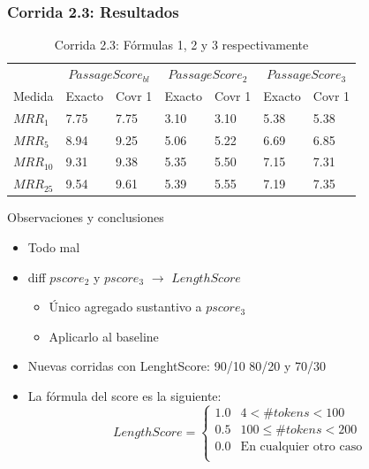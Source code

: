 \begin{frame}
\frametitle{Corrida 2.3: Resultados}
\begin{table}
\centering
\begin{center}

\begin{tabular}{|l | l | l | l | l | l | l |}

& \multicolumn{2}{|c|}{$PassageScore_{bl}$} & \multicolumn{2}{|c|}{$PassageScore_2$} & \multicolumn{2}{|c|}{$PassageScore_3$}\\ 
Medida & Exacto & Covr 1 & Exacto & Covr 1 & Exacto & Covr 1 \\ 
$MRR_{1}$ & 7.75 & 7.75 & 3.10 & 3.10 & 5.38 & 5.38  \\ 
$MRR_{5}$ & 8.94 & 9.25 & 5.06 & 5.22 &  6.69 & 6.85  \\ 
$MRR_{10}$ & 9.31 & 9.38 & 5.35 & 5.50 &  7.15 & 7.31  \\ 
$MRR_{25}$ & 9.54 & 9.61 & 5.39 & 5.55 &  7.19 & 7.35  \\ 
\end{tabular}
\caption{Corrida 2.3: Fórmulas 1, 2 y 3 respectivamente}
\end{center}
\end{table}

Observaciones y conclusiones
\begin{itemize}
  \item Todo mal
  \item diff $pscore_2$ y $pscore_3$ $\rightarrow$ $LengthScore$ 
  \begin{itemize}
    \item Único agregado sustantivo a $pscore_3$
    \item Aplicarlo al baseline
  \end{itemize}
  \item Nuevas corridas con LenghtScore: 90/10 80/20 y 70/30
  \item La fórmula del score es la siguiente:
    \begin{equation*}
        LengthScore = \begin{cases}
                   1.0     & 4 <   \#tokens < 100\\
                   0.5     & 100 \leq \#tokens < 200 \\
                   0.0     & \text{En cualquier otro caso}\\
               \end{cases}
    \end{equation*}
  \end{itemize}

\end{frame}

